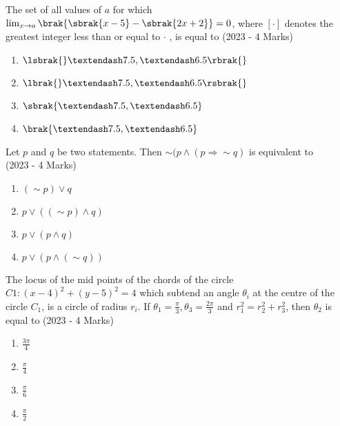 \iffalse
\title{Assignment 1}
\author{Siddhanth Yellanki - ee24btech11059}
\section{mcq-single}
\fi

    \item{
          	The set of all values of $a$ for which $\lim_{x\to a} \brak{\sbrak{x-5} - \sbrak{2x+2}}= 0$, where $[\cdot]$ denotes the greatest integer less than or equal to $\cdot$ , is equal to \text{  } \hfill
                {(2023 - 4 Marks)}
                \begin{multicols}{4}
					\begin{enumerate}
						\item $\lsbrak{}–7.5, –6.5\rbrak{} $
						\item $\lbrak{}–7.5, –6.5\rsbrak{} $
						\item $\sbrak{–7.5, –6.5} $
						\item $\brak{–7.5, –6.5} $
					\end{enumerate}
				\end{multicols}
            }
    \item{
           	Let $p$ and $q$ be two statements. Then $\sim (p \land (p \Rightarrow \sim q)$ is equivalent to \\ \text{ }
           	\hfill
           	{(2023 - 4 Marks)}
                \begin{multicols}{4}
                	\begin{enumerate}
                		\item $(\sim p) \lor q$
                		\item $p \lor ((\sim p) \land q)$
                		\item $p \lor (p \land q)$
                		\item $p \lor (p \land(\sim q))$
                	\end{enumerate}
                \end{multicols}
        }
\item{
        	
        	The locus of the mid points of the chords of the circle $C1: (x - 4)^2 + (y - 5)^2 = 4$ which subtend an angle $\theta_i$ at the centre of the circle $C_1$, is a circle of radius $r_i$. If $\theta_1 = \frac{\pi}{3}, \theta_3 = \frac{2\pi}{3}$ and $r_1^2 = r_2^2+r_3^2$, then $\theta_2$ is equal to
        	\hfill
        	{(2023 - 4 Marks)}
        	\begin{multicols}{4}
        		\begin{enumerate}
        			\item  $\frac{3\pi}{4}$
        			\item  $\frac{\pi}{4}$
        			\item  $\frac{\pi}{6}$
        			\item  $\frac{\pi}{2}$
        		\end{enumerate}
        	\end{multicols}
        	
        }
